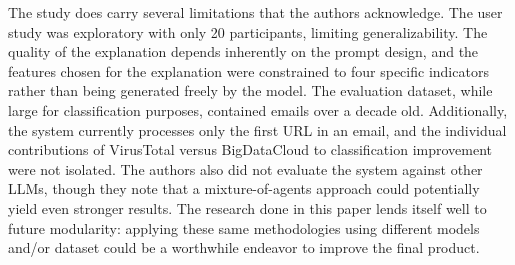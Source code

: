 \documentclass[conference]{IEEEtran}
\begin{document}
The study does carry several limitations that the authors acknowledge. The user study was exploratory with only 20 participants, limiting generalizability. The quality of the explanation depends inherently on the prompt design, and the features chosen for the explanation were constrained to four specific indicators rather than being generated freely by the model\cite{desolda_apollo_2025}. The evaluation dataset, while large for classification purposes, contained emails over a decade old. Additionally, the system currently processes only the first URL in an email, and the individual contributions of VirusTotal versus BigDataCloud to classification improvement were not isolated. The authors also did not evaluate the system against other LLMs, though they note that a mixture-of-agents approach could potentially yield even stronger results\cite{desolda_apollo_2025}. The research done in this paper lends itself well to future modularity: applying these same methodologies using different models and/or dataset could be a worthwhile endeavor to improve the final product. 
\end{document}

